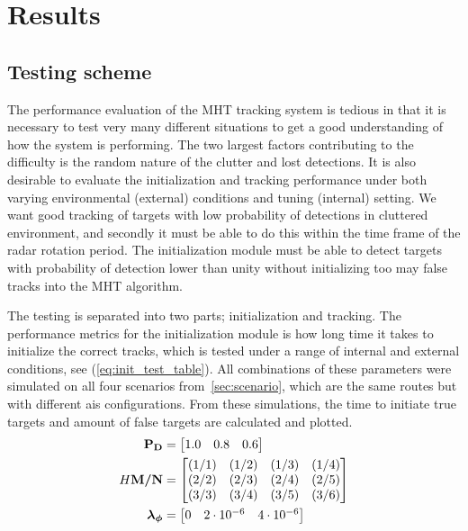 
\chapter{Results}\label{chapter:results}
\section{Testing scheme}
The performance evaluation of the MHT tracking system is tedious in that it is necessary to test very many different situations to get a good understanding of how the system is performing. The two largest factors contributing to the difficulty is the random nature of the clutter and lost detections. It is also desirable to evaluate the initialization and tracking performance under both varying environmental (external) conditions and tuning (internal) setting. We want good tracking of targets with low probability of detections in cluttered environment, and secondly it must be able to do this within the time frame of the radar rotation period. The initialization module must be able to detect targets with probability of detection lower than unity without initializing too may false tracks into the MHT algorithm.

The testing is separated into two parts; initialization and tracking. The performance metrics for the initialization module is how long time it takes to initialize the correct tracks, which is tested under a range of internal and external conditions, see (\ref{eq:init_test_table}). All combinations of these parameters were simulated on all four scenarios from~\ref{sec:scenario}, which are the same routes but with different \gls{ais} configurations. From these simulations, the time to initiate true targets and amount of false targets are calculated and plotted.
\begin{equation}{H}\label{eq:init_test_table}
\begin{split}
\boldsymbol{\mathbf{P_D}} &= \begin{bmatrix} 1.0 & 0.8 & 0.6 \end{bmatrix} \\
\boldsymbol{\mathbf{M/N}} &= \begin{bmatrix} 	(1/1) & (1/2) & (1/3) & (1/4) \\
							(2/2) & (2/3) & (2/4) & (2/5) \\
							(3/3) & (3/4) & (3/5) & (3/6)
		   \end{bmatrix} \\
\boldsymbol{\mathbf{\lambda_\phi}} &= \begin{bmatrix} 0 & 2\cdot10^{-6} & 4\cdot10^{-6} \end{bmatrix}
\end{split}
\end{equation}

